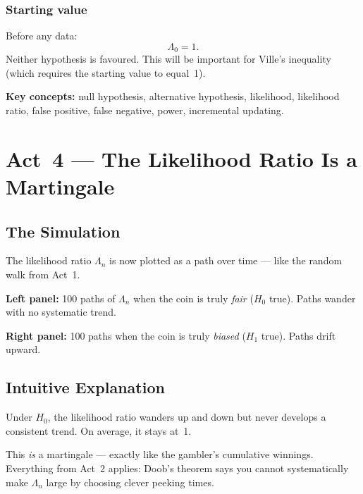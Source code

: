 \documentclass[12pt, a4paper]{article}
\newcommand{\LR}{\Lambda}              %
\begin{document}
\subsubsection*{Starting value}

Before any data:
\[
  \LR_0 = 1.
\]
Neither hypothesis is favoured.  This will be important for Ville's inequality
(which requires the starting value to equal~1).

\begin{keytakeaway}
\textbf{Key concepts:} null hypothesis, alternative hypothesis, likelihood,
likelihood ratio, false positive, false negative, power, incremental updating.
\end{keytakeaway}


\newpage
\section{Act~4 --- The Likelihood Ratio Is a Martingale}

\subsection{The Simulation}

\begin{simulation}
The likelihood ratio $\LR_n$ is now plotted as a path over time --- like the
random walk from Act~1.

\textbf{Left panel:} 100 paths of $\LR_n$ when the coin is truly \emph{fair}
($H_0$ true).  Paths wander with no systematic trend.

\textbf{Right panel:} 100 paths when the coin is truly \emph{biased}
($H_1$ true).  Paths drift upward.
\end{simulation}

\subsection{Intuitive Explanation}

\begin{intuition}
Under $H_0$, the likelihood ratio wanders up and down but never develops a
consistent trend.  On average, it stays at~1.

This \emph{is} a martingale --- exactly like the gambler's cumulative winnings.
Everything from Act~2 applies: Doob's theorem says you cannot systematically
make $\LR_n$ large by choosing clever peeking times.
\end{intuition}
\end{document}
